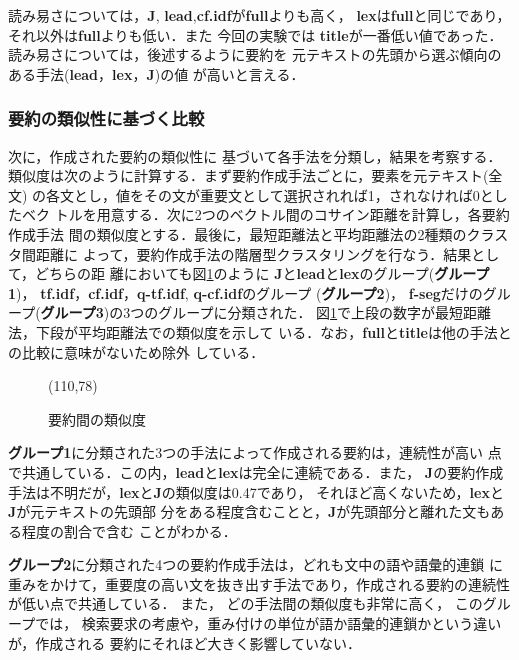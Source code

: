 読み易さについては，{\bf J}, {\bf lead},{\bf cf.idf}が{\bf full}よりも高く，
{\bf lex}は{\bf full}と同じであり，それ以外は{\bf full}よりも低い．また
今回の実験では
{\bf title}が一番低い値であった．
読み易さについては，後述するように要約を
元テキストの先頭から選ぶ傾向のある手法({\bf lead}，{\bf lex}，{\bf J})の値
が高いと言える．


\subsubsection{要約の類似性に基づく比較}\label{subsec:sumsim}
次に，作成された要約の類似性に
基づいて各手法を分類し，結果を考察する．
類似度は次のように計算する．まず要約作成手法ごとに，要素を元テキスト(全文)
の各文とし，値をその文が重要文として選択されれば1，されなければ0としたベク
トルを用意する．次に2つのベクトル間のコサイン距離を計算し，各要約作成手法
間の類似度とする．最後に，最短距離法と平均距離法の2種類のクラスタ間距離に
よって，要約作成手法の階層型クラスタリングを行なう．結果として，どちらの距
離においても図\ref{fig:sim}のように
{\bf J}と{\bf lead}と{\bf lex}のグループ({\bf グループ1})，
{\bf tf.idf}，{\bf cf.idf}，{\bf q-tf.idf}, {\bf q-cf.idf}のグループ
({\bf グループ2})，
{\bf f-seg}だけのグループ({\bf グループ3})の3つのグループに分類された．
図\ref{fig:sim}で上段の数字が最短距離法，下段が平均距離法での類似度を示して
いる．なお，{\bf full}と{\bf title}は他の手法との比較に意味がないため除外
している．

\begin{figure}[htbp]
\begin{center}
\atari(110,78)
\caption{要約間の類似度}\label{fig:sim}
\end{center}
\end{figure}

{\bf グループ1}に分類された3つの手法によって作成される要約は，連続性が高い
点で共通している．この内，{\bf lead}と{\bf lex}は完全に連続である．また，
{\bf J}の要約作成手法は不明だが，{\bf lex}と{\bf J}の類似度は0.47であり，
それほど高くないため，{\bf lex}と{\bf J}が元テキストの先頭部
分をある程度含むことと，{\bf J}が先頭部分と離れた文もある程度の割合で含む
ことがわかる．

{\bf グループ2}に分類された4つの要約作成手法は，どれも文中の語や語彙的連鎖
に重みをかけて，重要度の高い文を抜き出す手法であり，作成される要約の連続性
が低い点で共通している．
また，
どの手法間の類似度も非常に高く，
このグループでは，
検索要求の考慮や，重み付けの単位が語か語彙的連鎖かという違いが，作成される
要約にそれほど大きく影響していない．


